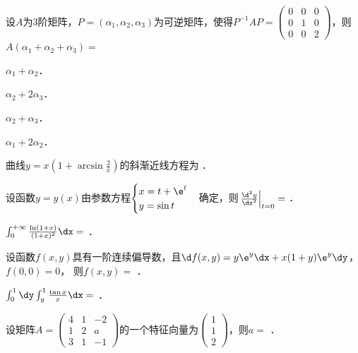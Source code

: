 \documentclass[plain,noanswer,medmath]{../../template/jnuexam}
\begin{document}


\begin{problem}
设$A$为$3$阶矩阵，$P = (\alpha_1,\alpha_2,\alpha_3)$为可逆矩阵，使得$P^{-1} AP = \begin{pmatrix}
  0 & 0 & 0 \\
  0 & 1 & 0 \\
  0 & 0 & 2
\end{pmatrix}$，则$A(\alpha_1 + \alpha_2 + \alpha_3) =$\pickout{}
\begin{abcd}
\item $\alpha_1 + \alpha_2$．
\item $\alpha_2 + 2\alpha_3$．
\item $\alpha_2 + \alpha_3$．
\item $\alpha_1 + 2\alpha_2$．
\end{abcd}
\end{problem}






\begin{problem}
曲线$y = x\left(1 + \arcsin \frac{2}{x} \right)$的斜渐近线方程为 \fillin{}．
\end{problem}


\begin{problem}
设函数$y = y(x)$由参数方程$\begin{cases}
  x = t + \e^t \\
  y = \sin t
\end{cases}$确定，则$\left.\frac{\d^2y}{\dx^2}\right|_{t=0} =$ \fillin{}．
\end{problem}


\begin{problem}
$\int_0^{+\infty} \frac{\ln(1 + x)}{(1 + x)^2}\dx =$ \fillin{}．
\end{problem}


\begin{problem}
设函数$f(x,y)$具有一阶连续偏导数，且$\d f(x,y) = y\e^y \dx + x(1 + y) \e^y \dy$，$f(0,0) = 0$，
则$f(x,y)=$ \fillin{}．
\end{problem}


\begin{problem}
$\int_0^1 \dy \int_y^1 \frac{\tan x}{x}\dx =$ \fillin{}．
\end{problem}


\begin{problem}
设矩阵$A = \begin{pmatrix}
  4 & 1 & -2 \\
  1 & 2 & a \\
  3 & 1 & -1
\end{pmatrix}$的一个特征向量为$\begin{pmatrix}
  1 \\
  1 \\
  2
\end{pmatrix}$，则$a =$ \fillin{}．
\end{problem}
\end{document}
